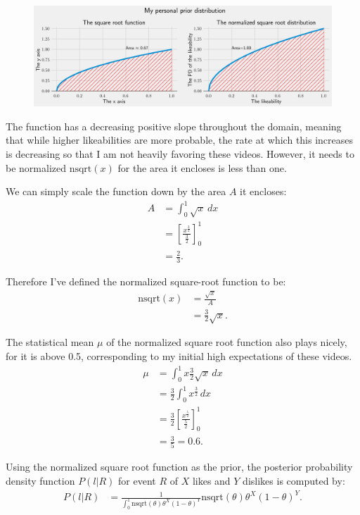 \documentclass[a4paper,11pt]{article}
\begin{document}
\begin{figure}[H]
    \centering
    \includegraphics[width=\textwidth]{assets/sqrt_per.png}
    \caption{}
    \label{fig:sqrt_per}
\end{figure}

The function has a decreasing positive slope throughout the domain, meaning that while higher likeabilities are more probable, the rate at which this increases is decreasing so that I am not heavily favoring these videos. However, it needs to be normalized $\text{nsqrt}(x)$ for the area it encloses is less than one.

We can simply scale the function down by the area $A$ it encloses:
\begin{align*}
    A &= \int_0^1 \sqrt{x} \, dx\\
    &= [\frac{x^{\frac{3}{2}}}{\frac{3}{2}}]^1_0\\
    &= \frac{2}{3}.
\end{align*}

Therefore I've defined the normalized square-root function to be:
\begin{align*}
     \text{nsqrt}(x) &= \frac{\sqrt{x}}{A}\\
    &= \frac{3}{2} \sqrt{x}.
\end{align*}

The statistical mean $\mu$ of the normalized square root function also plays nicely, for it is above 0.5, corresponding to my initial high expectations of these videos.
\begin{align*}
    \mu &= \int_0^1 x \frac{3}{2} \sqrt{x} \, dx\\
    &= \frac{3}{2} \int_0^1 x^{\frac{3}{2}} \, dx\\
    &= \frac{3}{2} [\frac{x^{\frac{5}{2}}}{\frac{5}{2}}]^1_0\\
    &= \frac{3}{5} = 0.6.
\end{align*}

Using the normalized square root function as the prior, the posterior probability density function $P(l|R)$ for event $R$ of $X$ likes and $Y$ dislikes is computed by:
\begin{align*}
    P(l|R) &= \frac{1}{\int_0^1 \text{nsqrt}(\theta) \theta^X (1-\theta)^Y } \text{nsqrt}(\theta) \theta^X (1-\theta)^Y.
\end{align*}
\end{document}
